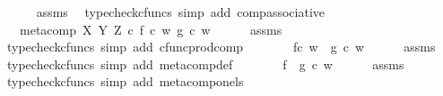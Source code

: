 \begin{isabellebody}
\ \ \ \ \isamarkupfalse%
\ assms\ \isamarkupfalse%
\ {\isacharparenleft}{\kern0pt}typecheck{\isacharunderscore}{\kern0pt}cfuncs{\isacharcomma}{\kern0pt}\ simp\ add{\isacharcolon}{\kern0pt}\ comp{\isacharunderscore}{\kern0pt}associative{}{\isacharparenright}{\kern0pt}\isanewline
\ \ \isamarkupfalse%
\ \isamarkupfalse%
\ {\isachardoublequoteopen}{\isachardot}{\kern0pt}{\isachardot}{\kern0pt}{\isachardot}{\kern0pt}\ {\isacharequal}{\kern0pt}\ meta{\isacharunderscore}{\kern0pt}comp\ X\ Y\ Z\ {\isasymcirc}\isactrlsub c\ {\isasymlangle}f\ {\isasymcirc}\isactrlsub c\ w{\isacharcomma}{\kern0pt}\ g\ {\isasymcirc}\isactrlsub c\ w{\isasymrangle}{\isachardoublequoteclose}\isanewline
\ \ \ \ \isamarkupfalse%
\ assms\ \isamarkupfalse%
\ {\isacharparenleft}{\kern0pt}typecheck{\isacharunderscore}{\kern0pt}cfuncs{\isacharcomma}{\kern0pt}\ simp\ add{\isacharcolon}{\kern0pt}\ cfunc{\isacharunderscore}{\kern0pt}prod{\isacharunderscore}{\kern0pt}comp{\isacharparenright}{\kern0pt}\isanewline
\ \ \isamarkupfalse%
\ \isamarkupfalse%
\ {\isachardoublequoteopen}{\isachardot}{\kern0pt}{\isachardot}{\kern0pt}{\isachardot}{\kern0pt}\ {\isacharequal}{\kern0pt}\ {\isacharparenleft}{\kern0pt}f{\isasymcirc}\isactrlsub c\ w{\isacharparenright}{\kern0pt}\ {\isasymbox}\ {\isacharparenleft}{\kern0pt}g\ {\isasymcirc}\isactrlsub c\ w{\isacharparenright}{\kern0pt}{\isachardoublequoteclose}\isanewline
\ \ \ \ \isamarkupfalse%
\ assms\ \isamarkupfalse%
\ {\isacharparenleft}{\kern0pt}typecheck{\isacharunderscore}{\kern0pt}cfuncs{\isacharcomma}{\kern0pt}\ simp\ add{\isacharcolon}{\kern0pt}\ meta{\isacharunderscore}{\kern0pt}comp{}{\isacharunderscore}{\kern0pt}def{}{\isacharparenright}{\kern0pt}\isanewline
\ \ \isamarkupfalse%
\ \isamarkupfalse%
\ {\isachardoublequoteopen}{\isachardot}{\kern0pt}{\isachardot}{\kern0pt}{\isachardot}{\kern0pt}\ {\isacharequal}{\kern0pt}\ {\isacharparenleft}{\kern0pt}f\ {\isasymbox}\ g{\isacharparenright}{\kern0pt}\ {\isasymcirc}\isactrlsub c\ w{\isachardoublequoteclose}\isanewline
\ \ \ \ \isamarkupfalse%
\ assms\ \isamarkupfalse%
\ {\isacharparenleft}{\kern0pt}typecheck{\isacharunderscore}{\kern0pt}cfuncs{\isacharcomma}{\kern0pt}\ simp\ add{\isacharcolon}{\kern0pt}\ meta{\isacharunderscore}{\kern0pt}comp{\isacharunderscore}{\kern0pt}on{\isacharunderscore}{\kern0pt}els{\isacharparenright}{\kern0pt}\isanewline

\end{isabellebody}
